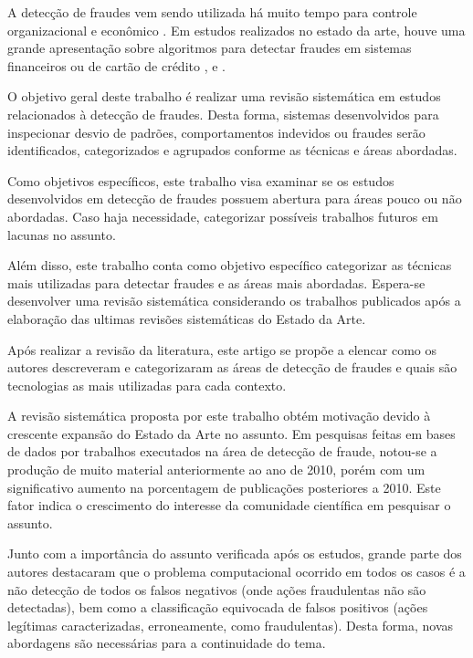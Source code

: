 \documentclass[smallextended]{svjour3}
\begin{document}
A detecção de fraudes vem sendo utilizada há muito tempo para controle organizacional e econômico \citep{Seyedhossein2010}. Em estudos realizados no estado da arte, houve uma grande apresentação sobre algoritmos para detectar fraudes em sistemas financeiros ou de cartão de crédito \citep{809570}, \citep{Chandola:2009:ADS:1541880.1541882} e \citep{Abdallah201690}.

O objetivo geral deste trabalho é realizar uma revisão sistemática em estudos relacionados à detecção de fraudes. Desta forma, sistemas desenvolvidos para inspecionar desvio de padrões, comportamentos indevidos ou fraudes serão identificados, categorizados e agrupados conforme as técnicas e áreas abordadas.

Como objetivos específicos, este trabalho visa examinar se os estudos desenvolvidos em detecção de fraudes possuem abertura para áreas pouco ou não abordadas. Caso haja necessidade, categorizar possíveis trabalhos futuros em lacunas no assunto.

Além disso, este trabalho conta como objetivo específico categorizar as técnicas mais utilizadas para detectar fraudes e as áreas mais abordadas. Espera-se desenvolver uma revisão sistemática considerando os trabalhos publicados após a elaboração das ultimas revisões sistemáticas do Estado da Arte.

Após realizar a revisão da literatura, este artigo se propõe a elencar como os autores descreveram e categorizaram as áreas de detecção de fraudes e quais são tecnologias as mais utilizadas para cada contexto.


A revisão sistemática proposta por este trabalho obtém motivação devido à crescente expansão do Estado da Arte no assunto. Em pesquisas feitas em bases de dados por trabalhos executados na área de detecção de fraude, notou-se a produção de muito material anteriormente ao ano de 2010, porém com um significativo aumento na porcentagem de publicações posteriores a 2010. Este fator indica o crescimento do interesse da comunidade científica em pesquisar o assunto.

Junto com a importância do assunto verificada após os estudos, grande parte dos autores destacaram que o problema computacional ocorrido em todos os casos é a não detecção de todos os falsos negativos (onde ações fraudulentas não são detectadas), bem como a classificação equivocada de falsos positivos (ações legítimas caracterizadas, erroneamente, como fraudulentas). Desta forma, novas abordagens são necessárias para a continuidade do tema.
\end{document}
